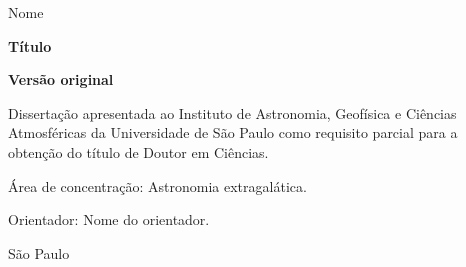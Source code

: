 
\thispagestyle{empty}%
\begin{center}
  Nome

  \vspace{2cm}

  \textbf{Título}

  \vspace{2cm}

  \textbf{Versão original}

  \vspace{2cm}

  \begin{flushright}
    \begin{minipage}{.7\linewidth}
      Dissertação apresentada ao Instituto de Astronomia, Geofísica e Ciências Atmosféricas da Universidade de São Paulo como requisito parcial para a obtenção do título de Doutor em \mbox{Ciências}.
    \end{minipage}
  \end{flushright}
  \vspace{-0.5cm}
  \begin{flushright}
    \begin{minipage}{.7\linewidth}
      Área de concentração: Astronomia extragalática.
    \end{minipage}
  \end{flushright}
  \vspace{-0.7cm}
  \begin{flushright}
    \begin{minipage}{.7\linewidth}
      Orientador: Nome do orientador.
    \end{minipage}
  \end{flushright}
  \vfill

  São Paulo\\
  \the\year\\

\end{center}

\newpage
\shipout\null %

\restoregeometry %